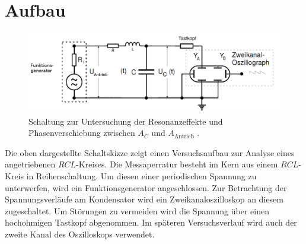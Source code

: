 \section{Aufbau}
\label{sec:Aufbau}

\begin{figure}[H]
         \centering
         \includegraphics[width=\linewidth-100pt,height=\textheight-100pt,keepaspectratio]{content/aufbau2.png}
         \caption{Schaltung zur Untersuchung der Resonanzeffekte und Phasenverschiebung zwischen $A_C$ und $A_{\text{Antrieb}}$ \cite{V354}.}
         \label{fig:Schalplanc}
       \end{figure}
 Die oben dargestellte Schaltskizze zeigt einen Versuchsaufbau zur Analyse eines
 angetriebenen $RCL$-Kreises. Die Messaperratur besteht im Kern aus einem
  $RCL$-Kreis in Reihenschaltung. Um diesen einer periodischen Spannung zu unterwerfen, wird ein
   Funktionsgenerator angeschlossen. Zur Betrachtung der Spannungsverläufe am
    Kondensator wird ein Zweikanaloszilloskop an diesem zugeschaltet. Um
     Störungen zu vermeiden wird die Spannung über einen hochohmigen Tastkopf abgenommen.
      Im späteren Versuchsverlauf wird auch der zweite Kanal des Oszilloskops verwendet.
